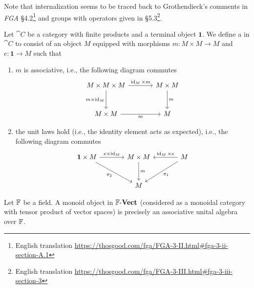 \begin{node}\label{bourbaki-000A}%
Note that internalization seems to be traced back to Grothendieck's
comments in \textit{FGA} \S4.2\footnote{English translation \url{https://thosgood.com/fga/FGA-3-II.html\#fga-3-ii-section-A.1}}
and groups with operators given in \S5.3\footnote{English translation \url{https://thosgood.com/fga/FGA-3-III.html\#fga-3-iii-section-3}}.
\end{node}

\begin{node}\label{internal-0007}%
\begin{definition}
Let $\cat{C}$ be a category with finite products and a terminal object
$\mathbf{1}$. We define a  in $\cat{C}$ to consist
of an object $M$ equipped with morphisms $m\colon M\times M\to M$
and $e\colon\mathbf{1}\to M$ such that
\begin{enumerate}
\item $m$ is associative, i.e., the following diagram commutes
\begin{equation*}
\begin{tikzcd}[sep=large]
M\times M\times M\ar[d,swap,"m\times\id_{M}"]\ar[r,"\id_{M}\times m"] & M\times M\ar[d,"m"]\\
M\times M\ar[r,swap,"m"] & M
\end{tikzcd}
\end{equation*}
\item the unit laws hold (i.e., the identity element acts as expected),
  i.e., the following diagram commutes
\begin{equation*}
\begin{tikzcd}[sep=large]
\mathbf{1}\times M\ar[dr,swap,"\pi_{2}"]\ar[r,"e\times\id_{M}"] &M\times M\ar[d,"m"] & \ar[l,swap,"\id_{M}\times e"]\ar[dl,"\pi_{1}"]M\\
& M &
\end{tikzcd}
\end{equation*}
\end{enumerate}
\end{definition}

\begin{node}[Examples]\label{internal-000J}%
\begin{node}\label{internal-000K}%
Let $\mathbb{F}$ be a field. A monoid object in $\mathbb{F}\textrm{-}\mathbf{Vect}$ (considered as a
monoidal category with tensor product of vector spaces) is precisely an
associative unital algebra over $\mathbb{F}$.
\end{node}


\end{node}
\end{node}
